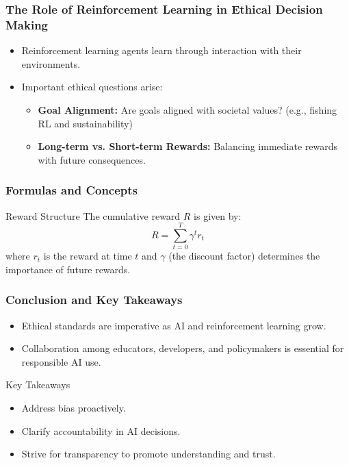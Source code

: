 \documentclass[aspectratio=169]{beamer}
\begin{document}
\begin{frame}[fragile]
    \frametitle{The Role of Reinforcement Learning in Ethical Decision Making}

    \begin{itemize}
        \item Reinforcement learning agents learn through interaction with their environments.
        \item Important ethical questions arise:
            \begin{itemize}
                \item \textbf{Goal Alignment:} Are goals aligned with societal values? (e.g., fishing RL and sustainability)
                \item \textbf{Long-term vs. Short-term Rewards:} Balancing immediate rewards with future consequences.
            \end{itemize}
    \end{itemize}
\end{frame}

\begin{frame}[fragile]
    \frametitle{Formulas and Concepts}

    \begin{block}{Reward Structure}
        The cumulative reward \( R \) is given by:
        \begin{equation}
        R = \sum_{t=0}^{T} \gamma^t r_t
        \end{equation}
        where \( r_t \) is the reward at time \( t \) and \( \gamma \) (the discount factor) determines the importance of future rewards.
    \end{block}
\end{frame}

\begin{frame}[fragile]
    \frametitle{Conclusion and Key Takeaways}
    
    \begin{itemize}
        \item Ethical standards are imperative as AI and reinforcement learning grow.
        \item Collaboration among educators, developers, and policymakers is essential for responsible AI use.
    \end{itemize}

    \begin{block}{Key Takeaways}
        \begin{itemize}
            \item Address bias proactively.
            \item Clarify accountability in AI decisions.
            \item Strive for transparency to promote understanding and trust.
        \end{itemize}
    \end{block}
\end{frame}
\end{document}
